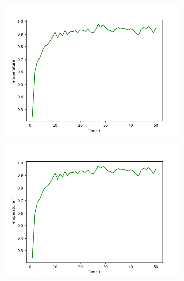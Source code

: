 \begin{figure}[ht]
\begin{subfigure}{0.3\textwidth}
\includegraphics[width=\textwidth]{../dat/Temperature.png}
\end{subfigure}
\hfill
\begin{subfigure}{0.3\textwidth}
\includegraphics[width=\textwidth]{../dat/Temperature.png}
\end{subfigure}
\hfill
\begin{subfigure}{0.3\textwidth}

\end{subfigure}
\end{figure}
